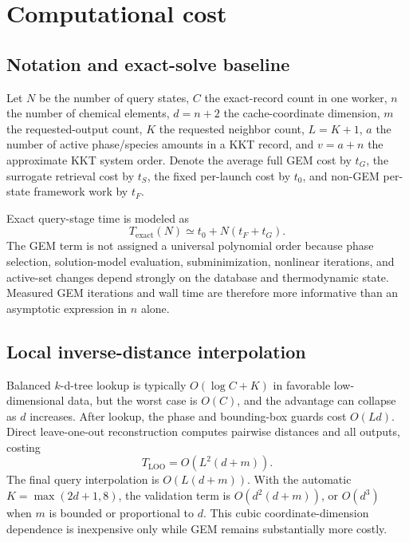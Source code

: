 \documentclass[11pt]{article}
\begin{document}
\section{Computational cost}

\subsection{Notation and exact-solve baseline}

Let \(N\) be the number of query states, \(C\) the exact-record count in one worker, \(n\) the
number of chemical elements, \(d=n+2\) the cache-coordinate dimension, \(m\) the requested-output
count, \(K\) the requested neighbor count, \(L=K+1\), \(a\) the number of active phase/species
amounts in a KKT record, and \(v=a+n\) the approximate KKT system order.  Denote the average full
GEM cost by \(t_G\), the surrogate retrieval cost by \(t_S\), the fixed per-launch cost by
\(t_0\), and non-GEM per-state framework work by \(t_F\).

Exact query-stage time is modeled as
\begin{equation}
  T_{\mathrm{exact}}(N)\simeq t_0+N(t_F+t_G).
  \label{eq:exact-cost-model}
\end{equation}
The GEM term is not assigned a universal polynomial order because phase selection, solution-model
evaluation, subminimization, nonlinear iterations, and active-set changes depend strongly on the
database and thermodynamic state.  Measured GEM iterations and wall time are therefore more
informative than an asymptotic expression in \(n\) alone.

\subsection{Local inverse-distance interpolation}

Balanced \(k\)-d-tree lookup is typically \(O(\log C+K)\) in favorable low-dimensional data, but
the worst case is \(O(C)\), and the advantage can collapse as \(d\) increases.  After lookup, the
phase and bounding-box guards cost \(O(Ld)\).  Direct leave-one-out reconstruction computes
pairwise distances and all outputs, costing
\begin{equation}
  T_{\mathrm{LOO}}=O\!\left(L^2(d+m)\right).
\end{equation}
The final query interpolation is \(O(L(d+m))\).  With the automatic
\(K=\max(2d+1,8)\), the validation term is \(O(d^2(d+m))\), or \(O(d^3)\) when \(m\) is bounded or
proportional to \(d\).  This cubic coordinate-dimension dependence is inexpensive only while
GEM remains substantially more costly.
\end{document}
